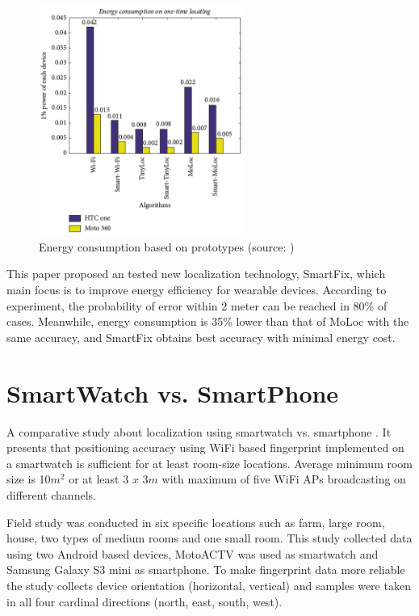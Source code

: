 \begin{figure}[H]
	\begin{centering}
		\includegraphics[width=0.6\textwidth]{img/smart_fix}
		\par\end{centering}
	\caption{Energy consumption based on prototypes (source: \cite{SmartFix})\label{fig:SmartFix}}
	\label{fig6}
\end{figure}

This paper proposed an tested new localization technology, SmartFix, which main focus is to improve energy efficiency for wearable devices. According to experiment, the probability of error within 2 meter can be reached in 80\% of cases. Meanwhile, energy consumption is 35\% lower than that of MoLoc with the same accuracy, and SmartFix obtains best accuracy with minimal energy cost.

\section{SmartWatch vs. SmartPhone}\label{sec:SWvsSP}
A comparative study about localization using smartwatch vs. smartphone \cite{SWvsSP}. It presents that positioning accuracy using WiFi based fingerprint implemented on a smartwatch is sufficient for at least room-size locations. Average minimum room size is 10$m^2$ or at least 3 $x$ 3$m$ with maximum of five WiFi APs broadcasting on different channels.

Field study was conducted in six specific locations such as farm, large room, house, two types of medium rooms and one small room. This study collected data using two Android based devices, MotoACTV was used as smartwatch and Samsung Galaxy S3 mini as smartphone. To make fingerprint data more reliable the study collects device orientation (horizontal, vertical) and samples were taken in all four cardinal directions (north, east, south, west).

